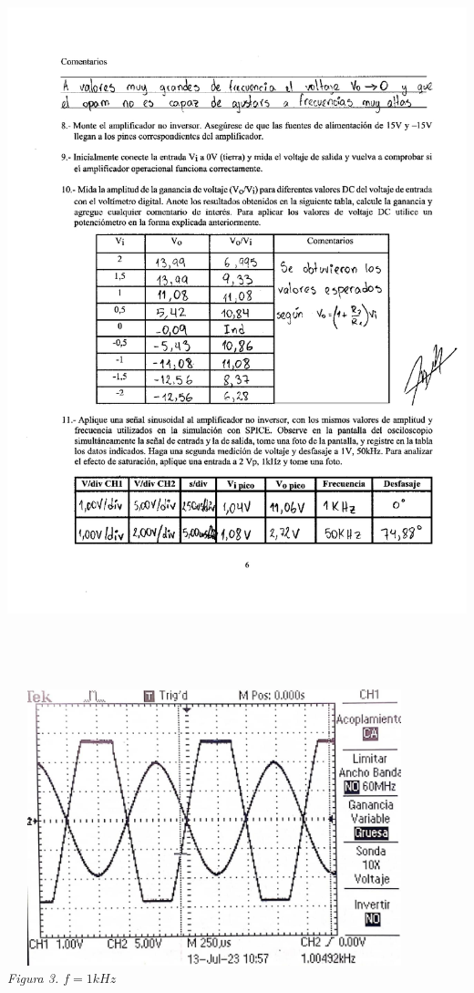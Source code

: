 \documentclass[12pt]{article}
\begin{document}
	\includegraphics[width=16cm,height=21cm]{Img/lab_9_page-0003}\\
	
	\begin{center}
		\includegraphics[width=12cm,height=8cm]{Img/q11-1}\\
		\textit{Figura 3. $f = 1kHz$}\\
		
		\vspace{3cm}
		
	\end{center}
\end{document}
